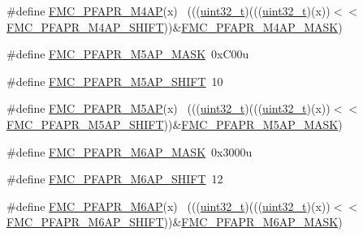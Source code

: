 \begin{DoxyCompactItemize}
\item 
\#define \hyperlink{group___f_m_c___register___masks_ga5d7440c8374ee7363cc86c2f43199b21}{F\+M\+C\+\_\+\+P\+F\+A\+P\+R\+\_\+\+M4\+AP}(x)                                            ~(((\hyperlink{_p_e___types_8h_a33594304e786b158f3fb30289278f5af}{uint32\+\_\+t})(((\hyperlink{_p_e___types_8h_a33594304e786b158f3fb30289278f5af}{uint32\+\_\+t})(x))$<$$<$\hyperlink{group___f_m_c___register___masks_gab5d59455fa080c08cf37d632a2b698cc}{F\+M\+C\+\_\+\+P\+F\+A\+P\+R\+\_\+\+M4\+A\+P\+\_\+\+S\+H\+I\+FT}))\&\hyperlink{group___f_m_c___register___masks_ga7a4045976082b3e527eddd6a51204aaa}{F\+M\+C\+\_\+\+P\+F\+A\+P\+R\+\_\+\+M4\+A\+P\+\_\+\+M\+A\+SK})
\item 
\#define \hyperlink{group___f_m_c___register___masks_ga85d2b86b0ca3d8a66162fbf7b5394ad7}{F\+M\+C\+\_\+\+P\+F\+A\+P\+R\+\_\+\+M5\+A\+P\+\_\+\+M\+A\+SK}~0x\+C00u
\item 
\#define \hyperlink{group___f_m_c___register___masks_gaf26c0e236405436e3ceb23fa596ce8a5}{F\+M\+C\+\_\+\+P\+F\+A\+P\+R\+\_\+\+M5\+A\+P\+\_\+\+S\+H\+I\+FT}~10
\item 
\#define \hyperlink{group___f_m_c___register___masks_gaac6da5fdc65fa1a8eacdd84223d4ea12}{F\+M\+C\+\_\+\+P\+F\+A\+P\+R\+\_\+\+M5\+AP}(x)                                            ~(((\hyperlink{_p_e___types_8h_a33594304e786b158f3fb30289278f5af}{uint32\+\_\+t})(((\hyperlink{_p_e___types_8h_a33594304e786b158f3fb30289278f5af}{uint32\+\_\+t})(x))$<$$<$\hyperlink{group___f_m_c___register___masks_gaf26c0e236405436e3ceb23fa596ce8a5}{F\+M\+C\+\_\+\+P\+F\+A\+P\+R\+\_\+\+M5\+A\+P\+\_\+\+S\+H\+I\+FT}))\&\hyperlink{group___f_m_c___register___masks_ga85d2b86b0ca3d8a66162fbf7b5394ad7}{F\+M\+C\+\_\+\+P\+F\+A\+P\+R\+\_\+\+M5\+A\+P\+\_\+\+M\+A\+SK})
\item 
\#define \hyperlink{group___f_m_c___register___masks_gaa369bff90649d5651eec5c6a306b3502}{F\+M\+C\+\_\+\+P\+F\+A\+P\+R\+\_\+\+M6\+A\+P\+\_\+\+M\+A\+SK}~0x3000u
\item 
\#define \hyperlink{group___f_m_c___register___masks_ga20c7a1c28737c267b2210e13f7483628}{F\+M\+C\+\_\+\+P\+F\+A\+P\+R\+\_\+\+M6\+A\+P\+\_\+\+S\+H\+I\+FT}~12
\item 
\#define \hyperlink{group___f_m_c___register___masks_ga406209e8b290dac802df4f5eafd631fc}{F\+M\+C\+\_\+\+P\+F\+A\+P\+R\+\_\+\+M6\+AP}(x)                                            ~(((\hyperlink{_p_e___types_8h_a33594304e786b158f3fb30289278f5af}{uint32\+\_\+t})(((\hyperlink{_p_e___types_8h_a33594304e786b158f3fb30289278f5af}{uint32\+\_\+t})(x))$<$$<$\hyperlink{group___f_m_c___register___masks_ga20c7a1c28737c267b2210e13f7483628}{F\+M\+C\+\_\+\+P\+F\+A\+P\+R\+\_\+\+M6\+A\+P\+\_\+\+S\+H\+I\+FT}))\&\hyperlink{group___f_m_c___register___masks_gaa369bff90649d5651eec5c6a306b3502}{F\+M\+C\+\_\+\+P\+F\+A\+P\+R\+\_\+\+M6\+A\+P\+\_\+\+M\+A\+SK})
$$
\end{DoxyCompactItemize}
